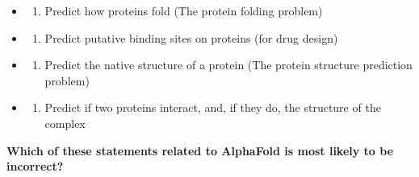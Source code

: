 \documentclass[
]{scrbook}
\providecommand{\tightlist}{%
  \setlength{\itemsep}{0pt}\setlength{\parskip}{0pt}}\usepackage{longtable,booktabs,array}
\begin{document}
\begin{itemize}
\tightlist
\item
  \begin{enumerate}
  \def\labelenumi{(\Alph{enumi})}
  \tightlist
  \item
    Predict how proteins fold (The protein folding problem)\\
  \end{enumerate}
\item
  \begin{enumerate}
  \def\labelenumi{(\Alph{enumi})}
  \setcounter{enumi}{1}
  \tightlist
  \item
    Predict putative binding sites on proteins (for drug design)\\
  \end{enumerate}
\item
  \begin{enumerate}
  \def\labelenumi{(\Alph{enumi})}
  \setcounter{enumi}{2}
  \tightlist
  \item
    Predict the native structure of a protein (The protein structure
    prediction problem)\\
  \end{enumerate}
\item
  \begin{enumerate}
  \def\labelenumi{(\Alph{enumi})}
  \setcounter{enumi}{3}
  \tightlist
  \item
    Predict if two proteins interact, and, if they do, the structure of
    the complex
  \end{enumerate}
\end{itemize}

\textbf{Which of these statements related to AlphaFold is most likely to
be incorrect?}
\end{document}
